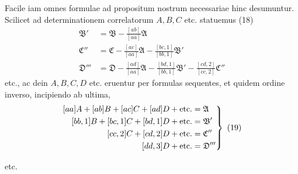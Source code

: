 Facile iam omnes formulae ad propositum nostrum necessariae hinc desumuntur. Scilicet ad determinationem correlatorum \(A,B,C\) etc. statuemus (18)
\[
\begin{aligned}
\mathfrak B'&=\mathfrak B-\frac{[ab]}{[aa]}\mathfrak A\\[5pt]
\mathfrak C''&=\mathfrak C-\frac{[ac]}{[aa]}\mathfrak A-\frac{[bc,1]}{[bb,1]}\mathfrak B'\\[5pt]
\mathfrak D'''&=\mathfrak D-\frac{[ad]}{[aa]}\mathfrak A-\frac{[bd,1]}{[bb,1]}\mathfrak B'-\frac{[cd,2]}{[cc,2]}\mathfrak C''
\end{aligned}
\]
etc., ac dein \(A,B,C,D\) etc. eruentur per formulas sequentes, et quidem ordine inverso, incipiendo ab ultima,
\[
\left.\begin{aligned}\relax
[aa]A+[ab]B+[ac]C+[ad]D+\text{etc.}&=\mathfrak A\\
[bb,1]B+[bc,1]C+[bd,1]D+\text{etc.}&=\mathfrak B'\\
[cc,2]C+[cd,2]D+\text{etc.}&=\mathfrak C''\\
[dd,3]D+\text{etc.}&=\mathfrak D'''
\end{aligned}\right\}\ (19)
\]
\begin{center}etc.\end{center}
